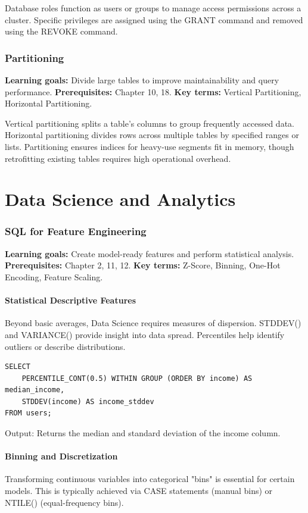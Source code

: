 \documentclass[12pt, a4paper]{article}
\begin{document}
Database roles function as users or groups to manage access permissions across a cluster.
Specific privileges are assigned using the GRANT command and removed using the REVOKE command.

\section{Partitioning}
\textbf{Learning goals:} Divide large tables to improve maintainability and query performance.
\textbf{Prerequisites:} Chapter 10, 18.
\textbf{Key terms:} Vertical Partitioning, Horizontal Partitioning.

Vertical partitioning splits a table's columns to group frequently accessed data.
Horizontal partitioning divides rows across multiple tables by specified ranges or lists.
Partitioning ensures indices for heavy-use segments fit in memory, though retrofitting existing tables requires high operational overhead.

\part{Data Science and Analytics}

\section{SQL for Feature Engineering}
\textbf{Learning goals:} Create model-ready features and perform statistical analysis.
\textbf{Prerequisites:} Chapter 2, 11, 12.
\textbf{Key terms:} Z-Score, Binning, One-Hot Encoding, Feature Scaling.

\subsection{Statistical Descriptive Features}
Beyond basic averages, Data Science requires measures of dispersion. STDDEV() and VARIANCE() provide insight into data spread. Percentiles help identify outliers or describe distributions.

\begin{verbatim}
SELECT 
    PERCENTILE_CONT(0.5) WITHIN GROUP (ORDER BY income) AS median_income,
    STDDEV(income) AS income_stddev
FROM users;
\end{verbatim}
Output: Returns the median and standard deviation of the income column.

\subsection{Binning and Discretization}
Transforming continuous variables into categorical "bins" is essential for certain models. This is typically achieved via CASE statements (manual bins) or NTILE() (equal-frequency bins).
\end{document}
